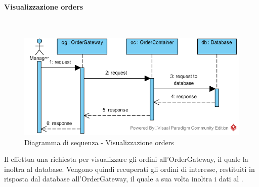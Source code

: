 \begin{samepage}
\paragraph{Visualizzazione orders}\mbox{}\\
\end{samepage}
\begin{figure}[H]
	\centering
	\includegraphics[width=14cm]{../../documenti/SpecificaTecnica/diagrammi_img/sequenza/direttore_visualizza_orders.png}
	\caption{Diagramma di sequenza - Visualizzazione orders}
\end{figure}
Il \Manager{} effettua una richiesta per visualizzare gli ordini all'Order\-Gateway, il quale la inoltra al database. Vengono quindi recuperati gli ordini di interesse, restituiti in risposta dal database all'Order\-Gateway, il quale a sua volta inoltra i dati al \Manager{}.